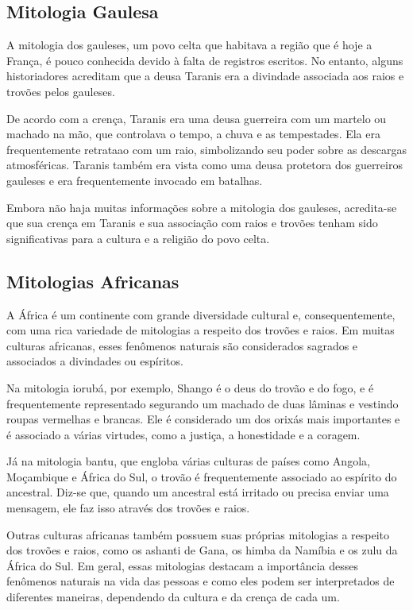 \documentclass[a4paper, 12pt, onecolumn,singlespacing]{article}
\begin{document}
	\subsection{Mitologia Gaulesa}
	
	A mitologia dos gauleses, um povo celta que habitava a região que é hoje a França, é pouco conhecida devido à falta de registros escritos. No entanto, alguns historiadores acreditam que a deusa Taranis era a divindade associada aos raios e trovões pelos gauleses.
	
	De acordo com a crença, Taranis era uma deusa guerreira com um martelo ou machado na mão, que controlava o tempo, a chuva e as tempestades. Ela era frequentemente retrataao com um raio, simbolizando seu poder sobre as descargas atmosféricas. Taranis também era vista como uma deusa protetora dos guerreiros gauleses e era frequentemente invocado em batalhas.
	
	Embora não haja muitas informações sobre a mitologia dos gauleses, acredita-se que sua crença em Taranis e sua associação com raios e trovões tenham sido significativas para a cultura e a religião do povo celta.
	
	\subsection{Mitologias Africanas}
	
	A África é um continente com grande diversidade cultural e, consequentemente, com uma rica variedade de mitologias a respeito dos trovões e raios. Em muitas culturas africanas, esses fenômenos naturais são considerados sagrados e associados a divindades ou espíritos.
	
	Na mitologia iorubá, por exemplo, Shango é o deus do trovão e do fogo, e é frequentemente representado segurando um machado de duas lâminas e vestindo roupas vermelhas e brancas. Ele é considerado um dos orixás mais importantes e é associado a várias virtudes, como a justiça, a honestidade e a coragem.
	
	Já na mitologia bantu, que engloba várias culturas de países como Angola, Moçambique e África do Sul, o trovão é frequentemente associado ao espírito do ancestral. Diz-se que, quando um ancestral está irritado ou precisa enviar uma mensagem, ele faz isso através dos trovões e raios.
	
	Outras culturas africanas também possuem suas próprias mitologias a respeito dos trovões e raios, como os ashanti de Gana, os himba da Namíbia e os zulu da África do Sul. Em geral, essas mitologias destacam a importância desses fenômenos naturais na vida das pessoas e como eles podem ser interpretados de diferentes maneiras, dependendo da cultura e da crença de cada um.
	
\end{document}

